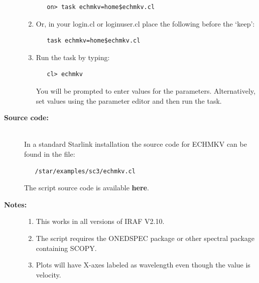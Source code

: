 \documentclass[twoside,11pt]{article}
\newcommand{\htmlref}[2]{#1}
\newenvironment{latexonly}{}{}
\renewcommand{\_}{\texttt{\symbol{95}}}
\begin{document}
\begin{description}
\begin{enumerate}
\begin{verbatim}
   on> task echmkv=home$echmkv.cl
\end{verbatim}

\item Or, in your login.cl or loginuser.cl place the following
      before the `keep':

\begin{verbatim}
   task echmkv=home$echmkv.cl
\end{verbatim}

\item Run the task by typing:

\begin{verbatim}
   cl> echmkv
\end{verbatim}

      You will be prompted
      to enter values for the parameters. Alternatively, set values
      using the parameter editor and then run the task.
\end{enumerate}

\item [{\bf Source code:}] \mbox{} \\
\begin{latexonly}
In a standard Starlink installation the source code for ECHMKV can be found
in the file:
\begin{verbatim}
   /star/examples/sc3/echmkv.cl
\end{verbatim}
\end{latexonly}
\begin{htmlonly}
      The script source code is available
      \htmlref{{\bf here}}{se_echmkv_source}.
\end{htmlonly}

\item [{\bf Notes:}] \mbox{}
\begin{enumerate}
\item This works in all versions of IRAF V2.10.

\item The script requires the ONEDSPEC package or other spectral
      package containing SCOPY.

\item Plots will have X-axes labeled as wavelength even though the
      value is velocity.
\end{enumerate}

\end{description}

\newpage
\end{document}
